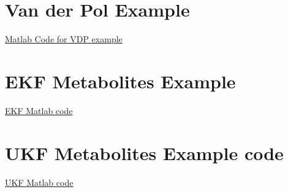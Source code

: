 


\chapter{Van der Pol Example}
\label{Van der Pol Code}
\href{https://github.com/lindseytam/LT_thesis/tree/master/code/MatLab_vdp_Example}{Matlab Code for VDP example}

\let\clearpage\relax

\chapter{EKF Metabolites Example}
\label{EKF metabolites example code}
\href{https://github.com/lindseytam/LT_thesis/tree/master/code/EKF_Meskin}{EKF Matlab code} 

\let\clearpage\relax

\chapter{UKF Metabolites Example code}
\label{UKF metabolites example code}
\href{https://github.com/lindseytam/LT_thesis/tree/master/code/UKF_Meskin}{UKF Matlab code}
